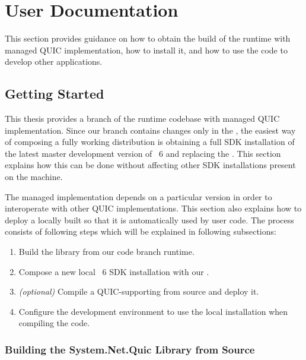 \chapter{User Documentation}

This section provides guidance on how to obtain the build of the \dotnet{} runtime with managed QUIC
implementation, how to install it, and how to use the code to develop other applications.

\section{Getting Started}

This thesis provides a branch of the \dotnet{} runtime codebase with managed QUIC implementation.
Since our branch contains changes only in the \SystemNetQuicDll{}, the easiest way of composing a
fully working \dotnet{} distribution is obtaining a full SDK installation of the latest master
development version of \dotnet{}~6 and replacing the \SystemNetQuicDll{}. This section explains how
this can be done without affecting other \dotnet{} SDK installations present on the machine.

The managed implementation depends on a particular \libopenssl{} version in order to interoperate
with other QUIC implementations. This section also explains how to deploy a locally built
\libopenssl{} so that it is automatically used by user code. The process consists of following
steps which will be explained in following subsections:

\begin{enumerate}

  \item Build the \SystemNetQuicDll{} library from our code branch runtime.

  \item Compose a new local \dotnet{}~6 SDK installation with our \SystemNetQuicDll{}.

  \item \textit{(optional)} Compile a QUIC-supporting \libopenssl{} from source and deploy it.

  \item Configure the development environment to use the local installation when compiling the code.

\end{enumerate}

\subsection{Building the System.Net.Quic Library from Source}

